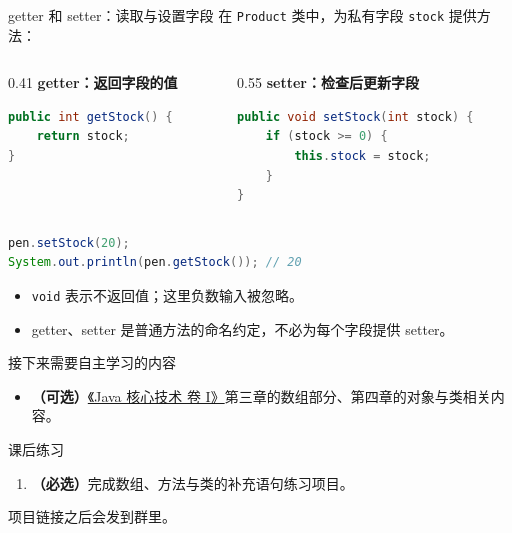 \documentclass[aspectratio=169]{beamer}
\begin{document}
\begin{frame}[fragile]{getter 和 setter：读取与设置字段}
  在 \texttt{Product} 类中，为私有字段 \texttt{stock} 提供方法：
  \begin{columns}[T,onlytextwidth]
    \begin{column}{0.41\textwidth}
      \textbf{getter：返回字段的值}
      \begin{lstlisting}[language=Java]
public int getStock() {
    return stock;
}
      \end{lstlisting}
    \end{column}
    \begin{column}{0.55\textwidth}
      \textbf{setter：检查后更新字段}
      \begin{lstlisting}[language=Java]
public void setStock(int stock) {
    if (stock >= 0) {
        this.stock = stock;
    }
}
      \end{lstlisting}
    \end{column}
  \end{columns}
  \begin{lstlisting}[language=Java]
pen.setStock(20);
System.out.println(pen.getStock()); // 20
  \end{lstlisting}
  \begin{itemize}
    \item \texttt{void} 表示不返回值；这里负数输入被忽略。
    \item getter、setter 是普通方法的命名约定，不必为每个字段提供 setter。
  \end{itemize}
\end{frame}

\begin{frame}{接下来需要自主学习的内容}
  \begin{itemize}

    \item \textbf{（可选）}\href{https://www.informit.com/store/core-java-volumei-fundamentals-9780135558607}{《Java 核心技术 卷 I》}第三章的数组部分、第四章的对象与类相关内容。
  \end{itemize}
\end{frame}

\begin{frame}{课后练习}
  \begin{enumerate}
    \item \textbf{（必选）}完成数组、方法与类的补充语句练习项目。
  \end{enumerate}
  \bigskip
  项目链接之后会发到群里。
\end{frame}
\end{document}
